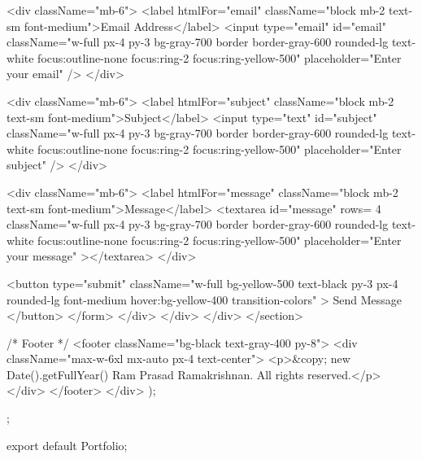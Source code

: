 {                <div className="mb-6">
                  <label htmlFor="email" className="block mb-2 text-sm font-medium">Email Address</label>
                  <input
                    type="email"
                    id="email"
                    className="w-full px-4 py-3 bg-gray-700 border border-gray-600 rounded-lg text-white focus:outline-none focus:ring-2 focus:ring-yellow-500"
                    placeholder="Enter your email"
                  />
                </div>
                
                <div className="mb-6">
                  <label htmlFor="subject" className="block mb-2 text-sm font-medium">Subject</label>
                  <input
                    type="text"
                    id="subject"
                    className="w-full px-4 py-3 bg-gray-700 border border-gray-600 rounded-lg text-white focus:outline-none focus:ring-2 focus:ring-yellow-500"
                    placeholder="Enter subject"
                  />
                </div>
                
                <div className="mb-6">
                  <label htmlFor="message" className="block mb-2 text-sm font-medium">Message</label>
                  <textarea
                    id="message"
                    rows= {4}
                    className="w-full px-4 py-3 bg-gray-700 border border-gray-600 rounded-lg text-white focus:outline-none focus:ring-2 focus:ring-yellow-500"
                    placeholder="Enter your message"
                  ></textarea>
                </div>
                
                <button
                  type="submit"
                  className="w-full bg-yellow-500 text-black py-3 px-4 rounded-lg font-medium hover:bg-yellow-400 transition-colors"
                >
                  Send Message
                </button>
              </form>
            </div>
          </div>
        </div>
      </section>

      {/* Footer */}
      <footer className="bg-black text-gray-400 py-8">
        <div className="max-w-6xl mx-auto px-4 text-center">
          <p>&copy; {new Date().getFullYear()} Ram Prasad Ramakrishnan. All rights reserved.</p>
        </div>
      </footer>
    </div>
  );
};

export default Portfolio;